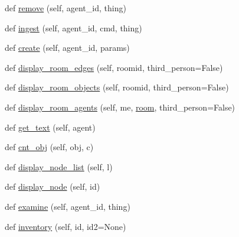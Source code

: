 \begin{DoxyCompactItemize}
def \hyperlink{classmastering__the__dungeon_1_1tasks_1_1graph__world2_1_1graph_1_1Graph_ad7707b274f24d19b9e910544b2b8023b}{remove} (self, agent\+\_\+id, thing)
\item 
def \hyperlink{classmastering__the__dungeon_1_1tasks_1_1graph__world2_1_1graph_1_1Graph_ae7815030738f1dab61ff8f47de78442d}{ingest} (self, agent\+\_\+id, cmd, thing)
\item 
def \hyperlink{classmastering__the__dungeon_1_1tasks_1_1graph__world2_1_1graph_1_1Graph_af543d6256a0001e8c7d13285bdff2c1a}{create} (self, agent\+\_\+id, params)
\item 
def \hyperlink{classmastering__the__dungeon_1_1tasks_1_1graph__world2_1_1graph_1_1Graph_ac0e5e4ffa325ec4c63f0f26d055c2e23}{display\+\_\+room\+\_\+edges} (self, roomid, third\+\_\+person=False)
\item 
def \hyperlink{classmastering__the__dungeon_1_1tasks_1_1graph__world2_1_1graph_1_1Graph_a1b95c16880df744d95de3fd1213f912f}{display\+\_\+room\+\_\+objects} (self, roomid, third\+\_\+person=False)
\item 
def \hyperlink{classmastering__the__dungeon_1_1tasks_1_1graph__world2_1_1graph_1_1Graph_aada7beb45751c1432f1b5056bfd927e7}{display\+\_\+room\+\_\+agents} (self, me, \hyperlink{classmastering__the__dungeon_1_1tasks_1_1graph__world2_1_1graph_1_1Graph_aaa7e8c07a96b32ac6cfa2f06b5f1772a}{room}, third\+\_\+person=False)
\item 
def \hyperlink{classmastering__the__dungeon_1_1tasks_1_1graph__world2_1_1graph_1_1Graph_a4b907114300b2b6fe26492336654dc3a}{get\+\_\+text} (self, agent)
\item 
def \hyperlink{classmastering__the__dungeon_1_1tasks_1_1graph__world2_1_1graph_1_1Graph_a02912f17088f70619bcab3a6e2435bed}{cnt\+\_\+obj} (self, obj, c)
\item 
def \hyperlink{classmastering__the__dungeon_1_1tasks_1_1graph__world2_1_1graph_1_1Graph_aec236f9614180209537d7ce1c1145649}{display\+\_\+node\+\_\+list} (self, l)
\item 
def \hyperlink{classmastering__the__dungeon_1_1tasks_1_1graph__world2_1_1graph_1_1Graph_a2c19742101a04eeb5850543393e553e6}{display\+\_\+node} (self, id)
\item 
def \hyperlink{classmastering__the__dungeon_1_1tasks_1_1graph__world2_1_1graph_1_1Graph_a305d2db72903f116e864dbe6c0005cdf}{examine} (self, agent\+\_\+id, thing)
\item 
def \hyperlink{classmastering__the__dungeon_1_1tasks_1_1graph__world2_1_1graph_1_1Graph_a32f9d5878b445f63dc2bc2745a0ec104}{inventory} (self, id, id2=None)

\end{DoxyCompactItemize}
